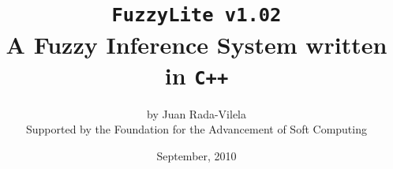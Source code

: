 \documentclass[11pt, final, a4paper, openany]{book}
\newcommand{\fl}{\texttt{FuzzyLite v1.02}}
\begin{document}
	\title{\fl\\A Fuzzy Inference System written in \texttt{C++}}
	\author{by Juan Rada-Vilela\\ \footnotesize Supported by the Foundation for the Advancement of Soft Computing}
	\date{September, 2010}
	
	\maketitle
	\setcounter{tocdepth}{4}
	
	\tableofcontents
	\listoffigures
	\pagestyle{fancy}	

	
	
	
	
	
\end{document}
